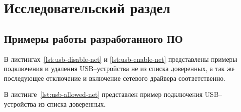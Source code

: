 \chapter{Исследовательский раздел}

\section{Примеры работы разработанного ПО}

В листингах~\ref{lst:usb-disable-net} и \ref{lst:usb-enable-net} представлены примеры подключения и удаления USB--устройства не из списка доверенных, а так же последующее отключение и включение сетевого драйвера соответственно.



В листинге~\ref{lst:usb-allowed-net} представлен пример подключения USB--устройства из списка доверенных.

